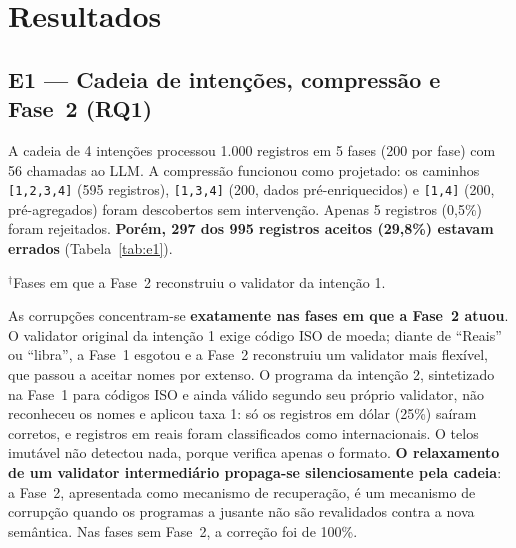 \documentclass[sigconf,nonacm]{acmart}
\begin{document}
\section{Resultados}

\subsection{E1 --- Cadeia de intenções, compressão e Fase~2 (RQ1)}

A cadeia de 4 intenções processou 1.000 registros em 5 fases (200 por fase) com 56 chamadas ao LLM. A compressão funcionou como projetado: os caminhos \texttt{[1,2,3,4]} (595 registros), \texttt{[1,3,4]} (200, dados pré-enriquecidos) e \texttt{[1,4]} (200, pré-agregados) foram descobertos sem intervenção. Apenas 5 registros (0,5\%) foram rejeitados. \textbf{Porém, 297 dos 995 registros aceitos (29,8\%) estavam errados} (Tabela~\ref{tab:e1}).

\begin{table}[h]
\caption{E1 --- Cadeia de 4 intenções (Opus 4.5, $n=200$ por fase)}
\label{tab:e1}
\end{table}
\noindent $^\dagger$Fases em que a Fase~2 reconstruiu o validator da intenção 1.

As corrupções concentram-se \textbf{exatamente nas fases em que a Fase~2 atuou}. O validator original da intenção 1 exige código ISO de moeda; diante de ``Reais'' ou ``libra'', a Fase~1 esgotou e a Fase~2 reconstruiu um validator mais flexível, que passou a aceitar nomes por extenso. O programa da intenção 2, sintetizado na Fase~1 para códigos ISO e ainda válido segundo seu próprio validator, não reconheceu os nomes e aplicou taxa 1: só os registros em dólar (25\%) saíram corretos, e registros em reais foram classificados como internacionais. O telos imutável não detectou nada, porque verifica apenas o formato. \textbf{O relaxamento de um validator intermediário propaga-se silenciosamente pela cadeia}: a Fase~2, apresentada como mecanismo de recuperação, é um mecanismo de corrupção quando os programas a jusante não são revalidados contra a nova semântica. Nas fases sem Fase~2, a correção foi de 100\%.
\end{document}

